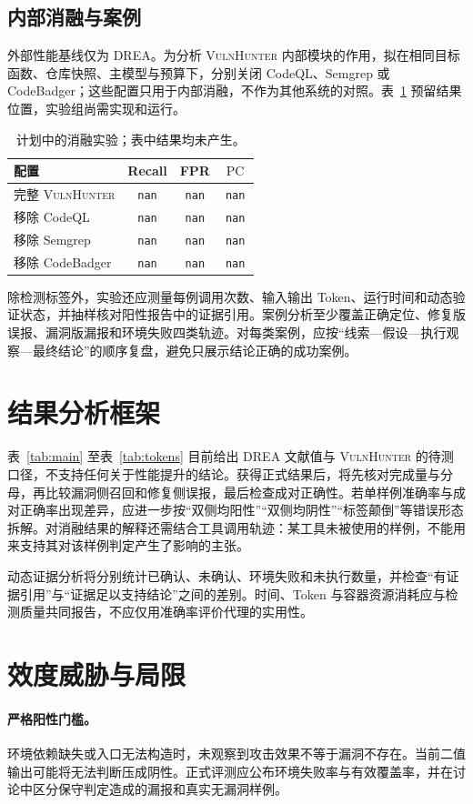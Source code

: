 \documentclass[times,twoside,watermark]{zHenriquesLab-StyleBioRxiv}
\newcommand{\VH}{\textsc{VulnHunter}}
\newcommand{\nan}{\texttt{nan}}
\newcommand{\PC}{\operatorname{PC}}
\begin{document}
\subsection*{内部消融与案例}
外部性能基线仅为 DREA。为分析 \VH{} 内部模块的作用，拟在相同目标函数、仓库快照、主模型与预算下，分别关闭 CodeQL、Semgrep 或 CodeBadger；这些配置只用于内部消融，不作为其他系统的对照。表~\ref{tab:ablation} 预留结果位置，实验组尚需实现和运行。
\begin{table}[H]
\centering
\caption{计划中的消融实验；表中结果均未产生。}
\label{tab:ablation}
\begin{tabular}{lccc}
\toprule
配置 & Recall & FPR & $\PC$\\
\midrule
完整 \VH{} & \nan{} & \nan{} & \nan{}\\
移除 CodeQL & \nan{} & \nan{} & \nan{}\\
移除 Semgrep & \nan{} & \nan{} & \nan{}\\
移除 CodeBadger & \nan{} & \nan{} & \nan{}\\
\bottomrule
\end{tabular}
\end{table}

除检测标签外，实验还应测量每例调用次数、输入输出 Token、运行时间和动态验证状态，并抽样核对阳性报告中的证据引用。案例分析至少覆盖正确定位、修复版误报、漏洞版漏报和环境失败四类轨迹。对每类案例，应按“线索—假设—执行观察—最终结论”的顺序复盘，避免只展示结论正确的成功案例。

\balance
\section*{结果分析框架}
表~\ref{tab:main} 至表~\ref{tab:tokens} 目前给出 DREA 文献值与 \VH{} 的待测口径，不支持任何关于性能提升的结论。获得正式结果后，将先核对完成量与分母，再比较漏洞侧召回和修复侧误报，最后检查\mbox{成对正确性}。若单样例准确率与成对正确率出现差异，应进一步按“双侧均阳性”“双侧均阴性”“标签颠倒”等错误形态拆解。对消融结果的解释还需结合工具调用轨迹：某工具未被使用的样例，不能用来支持其对该样例判定产生了影响的主张。

动态证据分析将分别统计已确认、未确认、环境失败和未执行数量，并检查“有证据引用”与“证据足以支持结论”之间的差别。时间、Token 与容器资源消耗应与检测质量共同报告，不应仅用准确率评价代理的实用性。

\section*{效度威胁与局限}
\paragraph{严格阳性门槛。} 环境依赖缺失或入口无法构造时，未观察到攻击效果不等于漏洞不存在。当前二值输出可能将无法判断压成阴性。正式评测应公布环境失败率与有效覆盖率，并在讨论中区分保守判定造成的漏报和真实无漏洞样例。
\end{document}
